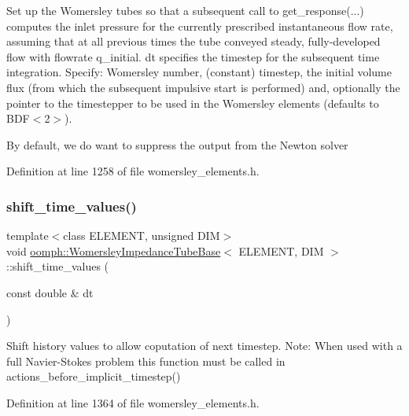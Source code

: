 Set up the Womersley tubes so that a subsequent call to get\+\_\+response(...) computes the inlet pressure for the currently prescribed instantaneous flow rate, assuming that at all previous times the tube conveyed steady, fully-\/developed flow with flowrate q\+\_\+initial. dt specifies the timestep for the subsequent time integration. Specify\+: Womersley number, (constant) timestep, the initial volume flux (from which the subsequent impulsive start is performed) and, optionally the pointer to the timestepper to be used in the Womersley elements (defaults to B\+D\+F$<$2$>$). 

By default, we do want to suppress the output from the Newton solver 

Definition at line 1258 of file womersley\+\_\+elements.\+h.

\mbox{\label{classoomph_1_1WomersleyImpedanceTubeBase_ad5796e64a6f25944dc9be6489149f513}} 
\subsubsection{\texorpdfstring{shift\+\_\+time\+\_\+values()}{shift\_time\_values()}}
{\footnotesize\ttfamily template$<$class E\+L\+E\+M\+E\+NT, unsigned D\+IM$>$ \\
void \hyperlink{classoomph_1_1WomersleyImpedanceTubeBase}{oomph\+::\+Womersley\+Impedance\+Tube\+Base}$<$ E\+L\+E\+M\+E\+NT, D\+IM $>$\+::shift\+\_\+time\+\_\+values (\begin{DoxyParamCaption}\item[{const double \&}]{dt }\end{DoxyParamCaption})\hspace{0.3cm}{\ttfamily [inline]}}



Shift history values to allow coputation of next timestep. Note\+: When used with a full Navier-\/\+Stokes problem this function must be called in actions\+\_\+before\+\_\+implicit\+\_\+timestep() 



Definition at line 1364 of file womersley\+\_\+elements.\+h.

